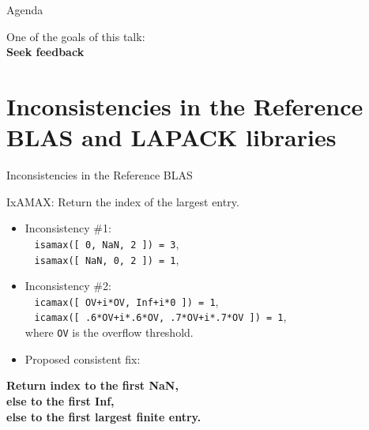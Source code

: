 \documentclass[11pt]{beamer}
\begin{document}
\begin{frame}{Agenda}

	\tableofcontents

	\begin{center}
		One of the goals of this talk:\\
		\textbf{Seek feedback}
	\end{center}

\end{frame}

\section{Inconsistencies in the Reference BLAS and LAPACK libraries}

\begin{frame}{Inconsistencies in the Reference BLAS}

	IxAMAX: Return the index of the largest entry.
	\begin{itemize}
		\item Inconsistency \#1:\\
		~ \texttt{isamax([ 0, NaN, 2 ]) = 3},\\
		~ \texttt{isamax([ NaN, 0, 2 ]) = 1},
		\item Inconsistency \#2:\\
		~ \texttt{icamax([ OV+i*OV, Inf+i*0 ]) = 1},\\
		~ \texttt{icamax([ .6*OV+i*.6*OV, .7*OV+i*.7*OV ]) = 1},\\
		where \texttt{OV} is the overflow threshold.
		\item Proposed consistent fix: 
	\end{itemize}

	\begin{center}
		\textbf{Return index to the first NaN,\\ else to the first Inf,\\ else to the first largest finite entry.}
	\end{center}
	


\end{frame}
\end{document}
